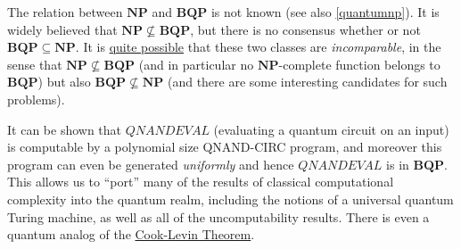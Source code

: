 
The relation between \(\mathbf{NP}\) and \(\mathbf{BQP}\) is not known
(see also \cref{quantumnp}). It is widely believed that
\(\mathbf{NP} \nsubseteq \mathbf{BQP}\), but there is no consensus
whether or not \(\mathbf{BQP} \subseteq \mathbf{NP}\). It is
\href{https://eccc.weizmann.ac.il/report/2018/107/}{quite possible} that
these two classes are \emph{incomparable}, in the sense that
\(\mathbf{NP} \nsubseteq \mathbf{BQP}\) (and in particular no
\(\mathbf{NP}\)-complete function belongs to \(\mathbf{BQP}\)) but also
\(\mathbf{BQP} \nsubseteq \mathbf{NP}\) (and there are some interesting
candidates for such problems).

It can be shown that \(\ensuremath{\mathit{QNANDEVAL}}\) (evaluating a
quantum circuit on an input) is computable by a polynomial size
QNAND-CIRC program, and moreover this program can even be generated
\emph{uniformly} and hence \(\ensuremath{\mathit{QNANDEVAL}}\) is in
\(\mathbf{BQP}\). This allows us to ``port'' many of the results of
classical computational complexity into the quantum realm, including the
notions of a universal quantum Turing machine, as well as all of the
uncomputability results. There is even a quantum analog of the
\href{https://arxiv.org/abs/1401.3916}{Cook-Levin Theorem}.

\hypertarget{quantumnonuniformrem}{}

